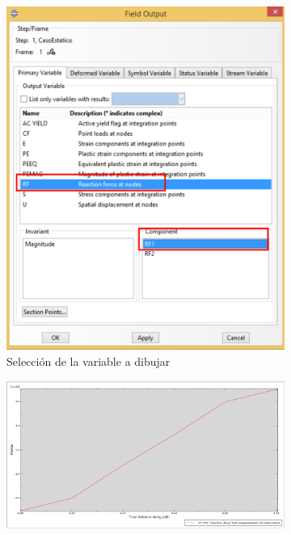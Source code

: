 \begin{enumerate}
\begin{figure}[H]
\centering
\begin{varwidth}{0.45\linewidth}  %
\begin{subfigure}{0.95\textwidth}
\includegraphics[width=\textwidth]{./body/images/imagen107.pdf}
\caption{Selección de la variable a dibujar}
\label{figu107}
\end{subfigure}
\end{varwidth}\quad%
\begin{varwidth}{0.55\linewidth}  %
\begin{subfigure}{0.99\textwidth}
\includegraphics[width=\textwidth]{./body/images/imagen108}

\end{subfigure}
\end{varwidth}
\end{figure}
\end{enumerate}
